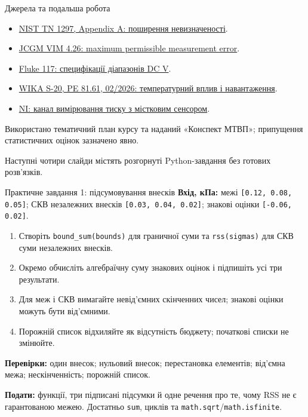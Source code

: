 \documentclass[aspectratio=169,11pt]{beamer}
\begin{document}
\begin{frame}{Джерела та подальша робота}
\small
\begin{itemize}
\item \href{https://www.nist.gov/pml/nist-technical-note-1297/nist-tn-1297-appendix-law-propagation-uncertainty}{NIST TN 1297, Appendix A: поширення невизначеності}.
\item \href{https://jcgm.bipm.org/vim/en/4.26.html}{JCGM VIM 4.26: maximum permissible measurement error}.
\item \href{https://www.fluke.com/en-us/product/electrical-testing/digital-multimeters/fluke-117}{Fluke 117: специфікації діапазонів DC V}.
\item \href{https://www.wika.com/media/Data-sheets/Pressure/Pressure-sensors/ds_pe8161_en_co.pdf}{WIKA S-20, PE 81.61, 02/2026: температурний вплив і навантаження}.
\item \href{https://www.ni.com/en/shop/data-acquisition/sensor-fundamentals/measuring-pressure-with-bridge-based-and-other-pressure-sensors.html}{NI: канал вимірювання тиску з містковим сенсором}.
\end{itemize}
Використано тематичний план курсу та наданий «Конспект МТВП»; припущення статистичних оцінок зазначено явно.
\medskip

Наступні чотири слайди містять розгорнуті Python-завдання без готових розв’язків.
\end{frame}

\appendix
\begin{frame}{Практичне завдання 1: підсумовування внесків}
\small
\textbf{Вхід, кПа:} межі \texttt{[0.12, 0.08, 0.05]}; СКВ незалежних внесків \texttt{[0.03, 0.04, 0.02]}; знакові оцінки \texttt{[-0.06, 0.02]}.
\begin{enumerate}
\item Створіть \texttt{bound\_sum(bounds)} для граничної суми та \texttt{rss(sigmas)} для СКВ суми незалежних внесків.
\item Окремо обчисліть алгебраїчну суму знакових оцінок і підпишіть усі три результати.
\item Для меж і СКВ вимагайте невід’ємних скінченних чисел; знакові оцінки можуть бути від’ємними.
\item Порожній список відхиляйте як відсутність бюджету; початкові списки не змінюйте.
\end{enumerate}
\textbf{Перевірки:} один внесок; нульовий внесок; перестановка елементів; від’ємна межа; нескінченність; порожній список.
\medskip

\textbf{Подати:} функції, три підписані підсумки й одне речення про те, чому RSS не є гарантованою межею. Достатньо \texttt{sum}, циклів та \texttt{math.sqrt}/\texttt{math.isfinite}.
\end{frame}
\end{document}
